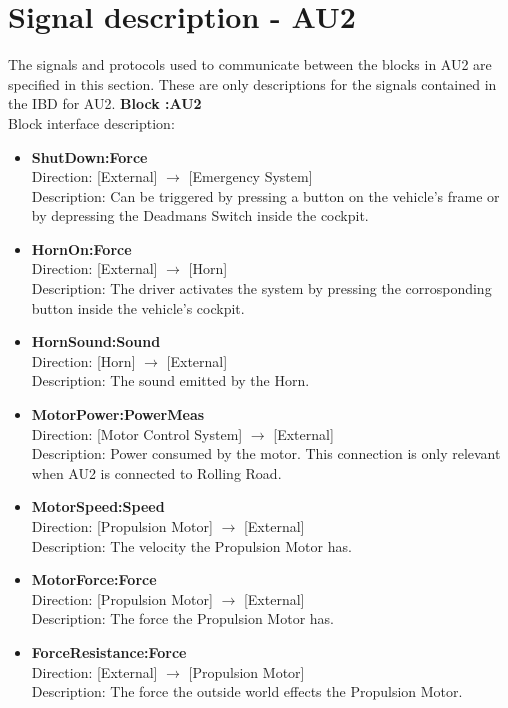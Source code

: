 \section{Signal description - AU2}
The signals and protocols used to communicate between the blocks in AU2 are specified in this section. These are only descriptions for the signals contained in the IBD for AU2.
\textbf{Block :AU2}\\
Block interface description:
\begin{itemize}
	\item \textbf{ShutDown:Force}\\
	Direction: [External] $\rightarrow$ [Emergency System]\\
	Description: Can be triggered by pressing a button on the vehicle's frame or by depressing the Deadmans Switch inside the cockpit.	
	\item \textbf{HornOn:Force}\\
	Direction: [External] $\rightarrow$ [Horn]\\
	Description: The driver activates the system by pressing the corrosponding button inside the vehicle's cockpit.
	\item \textbf{HornSound:Sound}\\
	Direction: [Horn] $\rightarrow$ [External]\\
	Description: The sound emitted by the Horn.
	\item \textbf{MotorPower:PowerMeas}\\
	Direction: [Motor Control System] $\rightarrow$ [External]\\
	Description: Power consumed by the motor. This connection is only relevant when AU2 is connected to Rolling Road.
	\item \textbf{MotorSpeed:Speed}\\
	Direction: [Propulsion Motor] $\rightarrow$ [External]\\
	Description: The velocity the Propulsion Motor has.
	\item \textbf{MotorForce:Force}\\
	Direction: [Propulsion Motor] $\rightarrow$ [External]\\
	Description: The force the Propulsion Motor has.
	\item \textbf{ForceResistance:Force}\\
	Direction: [External] $\rightarrow$ [Propulsion Motor]\\
	Description: The force the outside world effects the Propulsion Motor.

\end{itemize}
